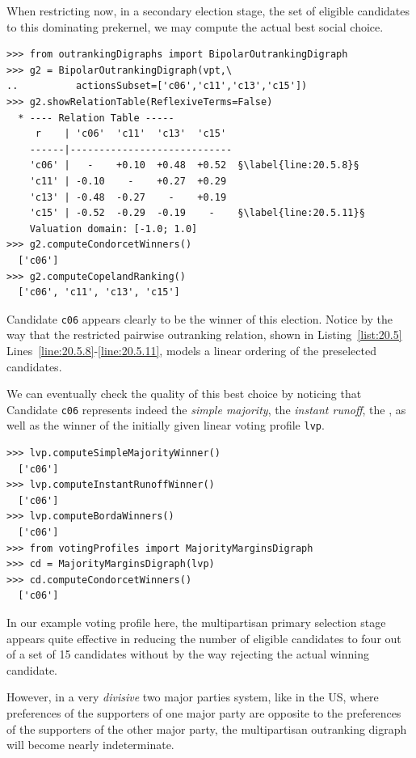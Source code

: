 When restricting now, in a secondary election stage, the set of eligible candidates to this dominating prekernel, we may compute the actual best social choice.
\begin{lstlisting}[caption={Recommending the secondary election winner},label=list:20.5]
>>> from outrankingDigraphs import BipolarOutrankingDigraph
>>> g2 = BipolarOutrankingDigraph(vpt,\
..          actionsSubset=['c06','c11','c13','c15'])
>>> g2.showRelationTable(ReflexiveTerms=False)
  * ---- Relation Table -----
     r    | 'c06'  'c11'  'c13'  'c15'   
    ------|----------------------------
    'c06' |   -    +0.10  +0.48  +0.52  §\label{line:20.5.8}§
    'c11' | -0.10    -    +0.27  +0.29  
    'c13' | -0.48  -0.27    -    +0.19  
    'c15' | -0.52  -0.29  -0.19    -    §\label{line:20.5.11}§
    Valuation domain: [-1.0; 1.0]
>>> g2.computeCondorcetWinners()
  ['c06']
>>> g2.computeCopelandRanking()
  ['c06', 'c11', 'c13', 'c15']
\end{lstlisting}

Candidate \texttt{c06} appears clearly to be the winner of this election. Notice by the way that the restricted pairwise outranking relation, shown in Listing~\ref{list:20.5} Lines~\ref{line:20.5.8}-\ref{line:20.5.11}, models a linear ordering of the preselected candidates.

We can eventually check the quality of this best choice by noticing that Candidate \texttt{c06} represents indeed the \emph{simple majority}, the \emph{instant runoff}, the \Borda, as well as the \Condorcet winner of the initially given linear voting profile \texttt{lvp}.
\begin{lstlisting}
>>> lvp.computeSimpleMajorityWinner()
  ['c06']
>>> lvp.computeInstantRunoffWinner()
  ['c06']
>>> lvp.computeBordaWinners()
  ['c06']
>>> from votingProfiles import MajorityMarginsDigraph
>>> cd = MajorityMarginsDigraph(lvp)
>>> cd.computeCondorcetWinners()
  ['c06']
\end{lstlisting}

In our example voting profile here, the multipartisan primary selection stage appears quite effective in reducing the number of eligible candidates to four out of a set of 15 candidates without by the way rejecting the actual winning candidate.

However, in a very \emph{divisive} two major parties system, like in the US, where preferences of the supporters of one major party are opposite to the preferences of the supporters of the other major party, the multipartisan outranking digraph will become nearly indeterminate.

